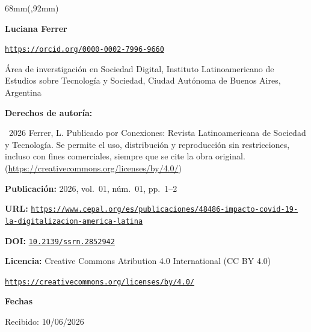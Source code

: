 \documentclass{article}
\newlength{\gbbloquex}
\begin{document}
\begin{textblock*}{68mm}(\gbbloquex,92mm)
{\setlength{\leftskip}{0pt}\setlength{\parindent}{0pt}%
\noindent\begin{minipage}[t]{68mm}
\sffamily\small\setlength{\parskip}{1pt}
{\bfseries\color{azulrevista}Luciana Ferrer}\par
{\scriptsize\texttt{\href{https://orcid.org/0000-0002-7996-9660}{https://orcid.org/0000-0002-7996-9660}}}\par
Área de inverstigación en Sociedad Digital, Instituto Latinoamericano de Estudios sobre Tecnología y Sociedad, Ciudad Autónoma de Buenos Aires, Argentina\par
\vspace{6pt}
{\bfseries\color{azulrevista!70}Derechos de autor\'ia:}\par
\textcopyright\ 2026 Ferrer, L. Publicado por Conexiones: Revista Latinoamericana de Sociedad y Tecnología. Se permite el uso, distribución y reproducción sin restricciones, incluso con fines comerciales, siempre que se cite la obra original. (\href{https://creativecommons.org/licenses/by/4.0/}{https://creativecommons.org/licenses/by/4.0/})\par\vspace{6pt}
{\bfseries\color{azulrevista!70}Publicación:} 2026, vol.~01, n\'um.~01, pp.~1--2\par\vspace{6pt}
{\bfseries\color{azulrevista!70}URL:} {\scriptsize\texttt{\href{https://www.cepal.org/es/publicaciones/48486-impacto-covid-19-la-digitalizacion-america-latina}{https://www.cepal.org/es/publicaciones/48486-impacto-covid-19-la-digitalizacion-america-latina}}}\par\vspace{6pt}
{\bfseries\color{azulrevista!70}DOI:} {\scriptsize\texttt{\href{https://doi.org/10.2139/ssrn.2852942}{10.2139/ssrn.2852942}}}\par\vspace{6pt}
{\bfseries\color{azulrevista!70}Licencia:} Creative Commons Atribution 4.0 International (CC BY 4.0)\par
{\scriptsize\texttt{\href{https://creativecommons.org/licenses/by/4.0/}{https://creativecommons.org/licenses/by/4.0/}}}\par
\vspace{6pt}
{\bfseries\color{azulrevista!70}Fechas}\par\vspace{2pt}
Recibido: 10/06/2026\par

\end{minipage}}
\end{textblock*}
\end{document}
